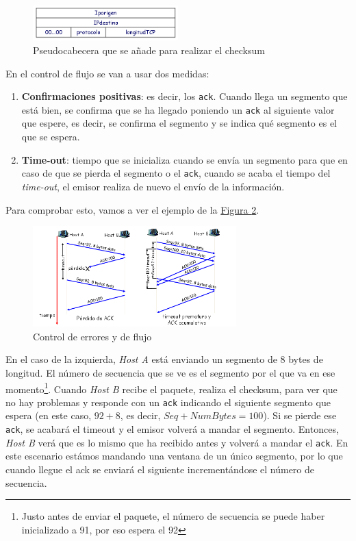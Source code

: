 \documentclass[10pt,a4paper,spanish]{report}
\begin{document}
\begin{figure}[!h]
  \centering
  \includegraphics[width=0.5\textwidth]{pseudocabecera}
  \caption{Pseudocabecera que se añade para realizar el checksum}
  \label{pseudo}
\end{figure}

En el control de flujo se van a usar dos medidas:

\begin{enumerate}
  \item \textbf{\textcolor{tema3}{Confirmaciones positivas}}: es decir, los \texttt{ack}. Cuando llega un segmento que está bien, se confirma que se ha llegado poniendo un \texttt{ack} al siguiente valor que espere, es decir, se confirma el segmento y se indica qué segmento es el que se espera.
  \item \textbf{\textcolor{tema3}{Time-out}}: tiempo que se inicializa cuando se envía un segmento para que en caso de que se pierda el segmento o el \texttt{ack}, cuando se acaba el tiempo del \textit{\textcolor{tema3}{time-out}}, el emisor realiza de nuevo el envío de la información. 
\end{enumerate}

Para comprobar esto, vamos a ver el ejemplo de la \hyperref[flujo-check]{Figura \ref*{flujo-check}}.

\begin{figure}[!h]
  \centering
  \includegraphics[width=0.7\textwidth]{errores}
  \caption{Control de errores y de flujo}
  \label{flujo-check}
\end{figure}

En el caso de la izquierda, \textit{Host A} está enviando un segmento de 8 bytes de longitud. El número de secuencia que se ve es el segmento por el que va en ese momento\footnote{Justo antes de enviar el paquete, el número de secuencia se puede haber inicializado a 91, por eso espera el 92}. Cuando \textit{Host B} recibe el paquete, realiza el checksum, para ver que no hay problemas y responde con un \texttt{ack} indicando el siguiente segmento que espera (en este caso, $92 + 8$, es decir, $Seq + NumBytes = 100$). Si se pierde ese \texttt{ack}, se acabará el timeout y el emisor volverá a mandar el segmento. Entonces, \textit{Host B} verá que es lo mismo que ha recibido antes y volverá a mandar el \texttt{ack}. En este escenario estámos mandando una ventana de un único segmento, por lo que cuando llegue el ack se enviará el siguiente incrementándose el número de secuencia.
\end{document}
